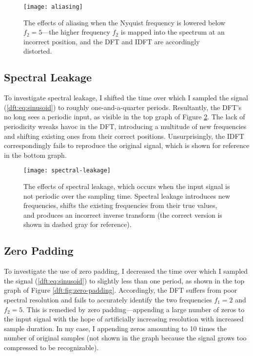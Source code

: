 \documentclass[11pt, a4paper]{article}
\begin{document}
\begin{figure}[htb!]
\centering
\texttt{[image: aliasing]}
\vspace{-8mm}
\caption{The effects of aliasing when the Nyquist frequency is lowered below $ f_{2} = 5 $---the higher frequency $ f_{2} $ is mapped into the spectrum at an incorrect position, and the DFT and IDFT are accordingly distorted.}
\label{dft:fig:aliasing}
\end{figure}


\subsection{Spectral Leakage}
To investigate spectral leakage, I shifted the time over which I sampled the signal (\ref{dft:eq:sinusoid}) to roughly one-and-a-quarter periods. Resultantly,  the DFT's no long sees a periodic input, as visible in the top graph of Figure \ref{dft:fig:spectral-leakage}. The lack of periodicity wreaks havoc in the DFT, introducing a multitude of new frequencies and shifting existing ones from their correct positions. Unsurprisingly, the IDFT correspondingly fails to reproduce the original signal, which is shown for reference in the bottom graph.


\begin{figure}[htb!]
\centering
\texttt{[image: spectral-leakage]}
\vspace{-8mm}
\caption{The effects of spectral leakage, which occurs when the input signal is not periodic over the sampling time. Spectral leakage introduces new frequencies, shifts the existing frequencies from their true values, and produces an incorrect inverse transform (the correct version is shown in dashed gray for reference).}
\label{dft:fig:spectral-leakage}
\end{figure}


\subsection{Zero Padding}
To investigate the use of zero padding, I decreased the time over which I sampled the signal (\ref{dft:eq:sinusoid}) to slightly less than one period, as shown in the top graph of Figure \ref{dft:fig:zero-padding}. Accordingly, the DFT suffers from poor spectral resolution and fails to accurately identify the two frequencies $ f_{1} = 2 $ and $ f_{2} = 5 $. This is remedied by zero padding---appending a large number of zeros to the input signal with the hope of artificially increasing resolution with increased sample duration. In my case, I appending zeros amounting to 10 times the number of original samples (not shown in the graph because the signal grows too compressed to be recognizable). 
\end{document}
